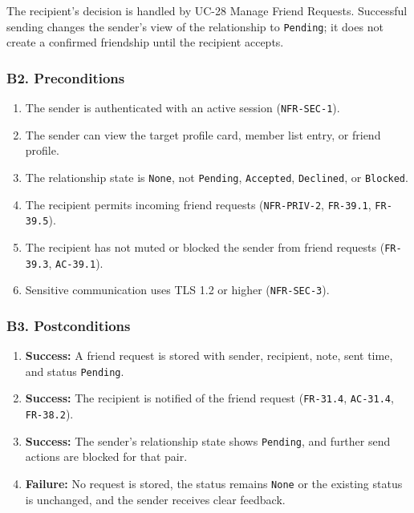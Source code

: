 \documentclass[12pt]{article}
\begin{document}
The recipient's decision is handled by UC-28 Manage Friend Requests. Successful sending changes the sender's view of the relationship to \texttt{Pending}; it does not create a confirmed friendship until the recipient accepts.
\par\medskip

\hypertarget{sec:b2-preconditions}{}
\subsubsection*{B2. Preconditions}
\par\medskip

\begin{enumerate}
\item The sender is authenticated with an active session (\texttt{NFR-SEC-1}).
\item The sender can view the target profile card, member list entry, or friend profile.
\item The relationship state is \texttt{None}, not \texttt{Pending}, \texttt{Accepted}, \texttt{Declined}, or \texttt{Blocked}.
\item The recipient permits incoming friend requests (\texttt{NFR-PRIV-2}, \texttt{FR-39.1}, \texttt{FR-39.5}).
\item The recipient has not muted or blocked the sender from friend requests (\texttt{FR-39.3}, \texttt{AC-39.1}).
\item Sensitive communication uses TLS 1.2 or higher (\texttt{NFR-SEC-3}).
\end{enumerate}
\par\medskip

\hypertarget{sec:b3-postconditions}{}
\subsubsection*{B3. Postconditions}
\par\medskip

\begin{enumerate}
\item \textbf{Success:} A friend request is stored with sender, recipient, note, sent time, and status \texttt{Pending}.
\item \textbf{Success:} The recipient is notified of the friend request (\texttt{FR-31.4}, \texttt{AC-31.4}, \texttt{FR-38.2}).
\item \textbf{Success:} The sender's relationship state shows \texttt{Pending}, and further send actions are blocked for that pair.
\item \textbf{Failure:} No request is stored, the status remains \texttt{None} or the existing status is unchanged, and the sender receives clear feedback.
\end{enumerate}
\par\medskip
\end{document}
